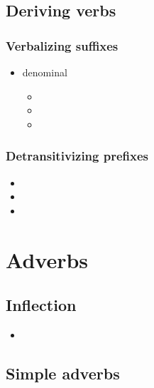 \documentclass{memoir}
\begin{document}
\section{\texorpdfstring{Deriving verbs
\label{sec:derivingverbs}}{Deriving verbs }}

\subsection{\texorpdfstring{Verbalizing suffixes
\label{sec:vbz}}{Verbalizing suffixes }}

\begin{itemize}
\tightlist
\item
  denominal

  \begin{itemize}
  \item
  \item
  \item
  \end{itemize}
\end{itemize}

\subsection{\texorpdfstring{Detransitivizing prefixes
\label{sec:detrz}}{Detransitivizing prefixes }}

\begin{itemize}
\item
\item
\item
\end{itemize}

\chapter{\texorpdfstring{Adverbs \label{adverbs}}{Adverbs }}

\section{\texorpdfstring{Inflection
\label{sec:adverbinfl}}{Inflection }}

\begin{itemize}
\tightlist
\item
\end{itemize}

\section{\texorpdfstring{Simple adverbs
\label{sec:simpleadv}}{Simple adverbs }}
\end{document}
